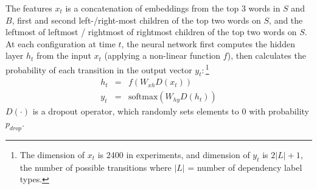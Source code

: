 The features $x_t$ is a concatenation of embeddings from the top 3 words in $S$ and $B$, first and second left-/right-most children of the top two words on $S$, and the leftmost of leftmost / rightmost of rightmost children of the top two words on $S$. At each configuration at time $t$, the neural network first computes the hidden layer $h_t$ from the input $x_t$ (applying a non-linear function $f$), then calculates the probability of each transition in the output vector $y_t:$\footnote{The dimension of $x_t$ is 2400 in experiments, and dimension of $y_t$ is $2|L|+1$, the number of possible transitions where $|L|$ = number of dependency label types.} %
\vspace{-1.0em}
\begin{eqnarray*}
  h_{t}\!\!\! &=& \!\!\! f (W_{xh} D(x_{t})) \\[-.2em]
  y_{t}\!\!\! &=& \!\!\! \mathrm{softmax} (W_{hy} D(h_{t}))
\end{eqnarray*}
$D(\cdot)$ is a dropout operator, which randomly sets elements to 0 with probability $p_{drop}$.

\vspace{-.5em}
